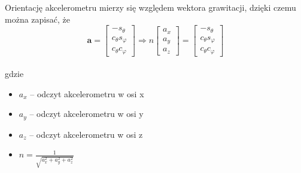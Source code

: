 Orientację akcelerometru mierzy się względem wektora grawitacji, dzięki czemu można zapisać, że
\begin{equation}
    \mathbf{a} =
    \left[
        \begin{array}{c}
            -s_{\theta} \\
            c_{\theta}s_{\varphi} \\
            c_{\theta}c_{\varphi}
        \end{array}
    \right]
    \Rightarrow
    n
    \left[
        \begin{array}{c}
            a_x \\
            a_y \\
            a_z
        \end{array}
    \right]
    =
    \left[
        \begin{array}{c}
            -s_{\theta} \\
            c_{\theta}s_{\varphi} \\
            c_{\theta}c_{\varphi}
        \end{array}
    \right]
    \label{Orientacja akcelerometru}
\end{equation}
\\
gdzie
\begin{itemize}
    \item $a_x$ -- odczyt akcelerometru w osi x
    \item $a_y$ -- odczyt akcelerometru w osi y
    \item $a_z$ -- odczyt akcelerometru w osi z
    \item $n = \frac{1}{\sqrt{a_x^2 + a_y^2 + a_z^2}}$ 
\end{itemize}

